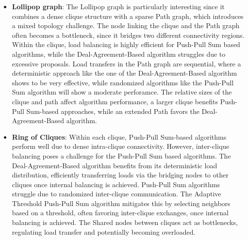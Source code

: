 \begin{itemize}
    \item \textbf{Lollipop graph}: The Lollipop graph is particularly interesting since it combines a dense clique structure with a sparse Path graph, which introduces a mixed topology challenge. The node linking the clique and the Path graph often becomes a bottleneck, since it bridges two different connectivity regions. Within the clique, load balancing is highly efficient for Push-Pull Sum based algorithms, while the Deal-Agreement-Based algorithm struggles due to excessive proposals. Load transfers in the Path graph are sequential, where a deterministic approach like the one of the Deal-Agreement-Based algorithm shows to be very effective, while randomized algorithms like the Push-Pull Sum algorithm will show a moderate perforamce. The relative sizes of the clique and path affect algorithm performance, a larger clique benefits Push-Pull Sum-based approaches, while an extended Path favors the Deal-Agreement-Based algorithm.
    \item \textbf{Ring of Cliques}: Within each clique, Push-Pull Sum-based algorithms perform well due to dense intra-clique connectivity. However, inter-clique balancing poses a challenge for the Push-Pull Sum based algorithms. The Deal-Agreement-Based algorithm benefits from its deterministic load distribution, efficiently transferring loads via the bridging nodes to other cliques once internal balancing is achieved. Push-Pull Sum algorithms struggle due to randomized inter-clique communication. The Adaptive Threshold Push-Pull Sum algorithm mitigates this by selecting neighbors based on a threshold, often favoring inter-clique exchanges, once internal balancing is achieved. The Shared nodes between cliques act as bottlenecks, regulating load transfer and potentially becoming overloaded.
\end{itemize}
